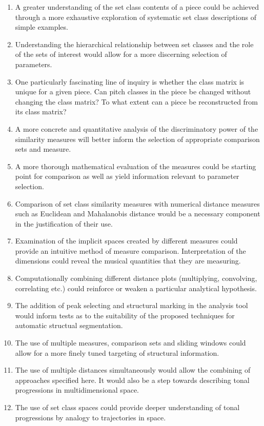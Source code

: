 \documentclass{article}
\begin{document}
\begin{enumerate}
\item A greater understanding of the set class contents of a piece could
   be achieved through a more exhaustive exploration of systematic set
   class descriptions of simple examples.
\item Understanding the hierarchical relationship between set classes and
   the role of the sets of interest would allow for a more discerning
   selection of parameters.
\item One particularly fascinating line of inquiry is whether the class
   matrix is unique for a given piece. Can pitch classes in the piece
   be changed without changing the class matrix? To what extent can a
   piece be reconstructed from its class matrix?
\item A more concrete and quantitative analysis of the discriminatory
   power of the similarity measures will better inform the selection of
   appropriate comparison sets and measure.
\item A more thorough mathematical evaluation of the measures could be
   starting point for comparison as well as yield information relevant
   to parameter selection.
\item Comparison of set class similarity measures with numerical distance
   measures such as Euclidean and Mahalanobis distance would be a
   necessary component in the justification of their use.
\item Examination of the implicit spaces created by different measures
   could provide an intuitive method of measure
   comparison. Interpretation of the dimensions could reveal the
   musical quantities that they are measuring.
\item Computationally combining different distance plots (multiplying,
   convolving, correlating etc.) could reinforce or weaken a particular
   analytical hypothesis.
\item The addition of peak selecting and structural marking in the
   analysis tool would inform tests as to the suitability of the
   proposed techniques for automatic structual segmentation.
\item The use of multiple measures, comparison sets and sliding windows
    could allow for a more finely tuned targeting of structural
    information.
\item The use of multiple distances simultaneously would allow the
    combining of approaches specified here. It would also be a step
    towards describing tonal progressions in multidimensional space.
\item The use of set class spaces could provide deeper understanding of
    tonal progressions by analogy to trajectories in space.
\end{enumerate}
\end{document}
